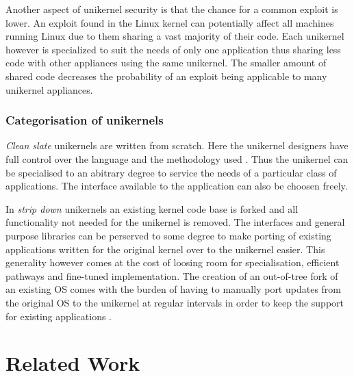 \documentclass[10pt,twocolumn,a4paper]{article}
\begin{document}
      Another aspect of unikernel security is that the chance for a common exploit is lower.
      An exploit found in the Linux kernel can potentially affect all machines running Linux
      due to them sharing a vast majority of their code.
      Each unikernel however is specialized to suit the needs of only one application thus
      sharing less code with other appliances using the same unikernel.
      The smaller amount of shared code decreases the probability of an exploit being applicable
      to many unikernel appliances.

    \subsubsection{Categorisation of unikernels}\label{sec:categories-of-unikernels}
      \textit{Clean slate} unikernels are written from scratch.
      Here the unikernel designers have full control over the language
      and the methodology used \cite{raza19}.
      Thus the unikernel can be specialised to an abitrary degree to service the needs
      of a particular class of applications.
      The interface available to the application can also be choosen freely.

      In \textit{strip down} unikernels an existing kernel code base is forked
      and all functionality not needed for the unikernel is removed.
      The interfaces and general purpose libraries can be perserved to some degree
      to make porting of existing applications written for the original kernel
      over to the unikernel easier. 
      This generality however comes at the cost of loosing room for specialisation,
      efficient pathways and fine-tuned implementation.
      The creation of an out-of-tree fork of an existing OS comes with the burden of
      having to manually port updates from the original OS to the unikernel at regular intervals
      in order to keep the support for existing applications \cite{raza19}.
      
\section{Related Work}\label{sec:relwork} 
\end{document}
